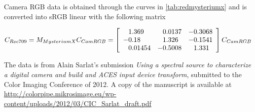 Camera \gls{RGB} data is obtained through the curves in
\cref{tab:redmysteriumx} and is converted into
\gls{sRGB} linear with the following matrix

\begin{displaymath}
C_{Rec709} = M_{MysteriumX} C_{CamRGB} = \left[\begin{array}{r@{.}lr@{.}lr@{.}l}
 1&369   &  0&0137 & -0&3068 \\
-0&18    &  1&326  & -0&1541 \\
 0&01454 & -0&5008 &  1&331  \\
\end{array}\right] C_{CamRGB}
\end{displaymath}

The data is from Alain Sarlat's submission \textit{Using a spectral source to characterize a digital camera
and build and ACES input device transform}, submitted to the Color Imaging Conference of 2012.
A copy of the manuscript is available at \url{http://colorpipe.mikrosimage.eu/wp-content/uploads/2012/03/CIC_Sarlat_draft.pdf}

